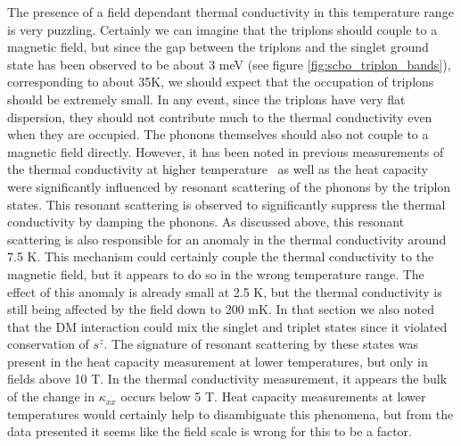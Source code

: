 \documentclass{thesis-umich}
\begin{document}
The presence of a field dependant thermal conductivity in this temperature range is very puzzling. Certainly we can imagine that the triplons should couple to a magnetic field, but since the gap between the triplons and the singlet ground state has been observed to be about 3 meV (see figure \ref{fig:scbo_triplon_bands}), corresponding to about 35K, we should expect that the occupation of triplons should be extremely small. In any event, since the triplons have very flat dispersion, they should not contribute much to the thermal conductivity even when they are occupied. The phonons themselves should also not couple to a magnetic field directly. However, it has been noted in previous measurements of the thermal conductivity at higher temperature~\cite{Hofmann2001} as well as the heat capacity~\cite{Jorge2005} were significantly influenced by resonant scattering of the phonons by the triplon states. This resonant scattering is observed to significantly suppress the thermal conductivity by damping the phonons. As discussed above, this resonant scattering is also responsible for an anomaly in the thermal conductivity around 7.5 K. This mechanism could certainly couple the thermal conductivity to the magnetic field, but it appears to do so in the wrong temperature range. The effect of this anomaly is already small at 2.5 K, but the thermal conductivity is still being affected by the field down to 200 mK. In that section we also noted that the DM interaction could mix the singlet and triplet states since it violated conservation of $s^z$. The signature of resonant scattering by these states was present in the heat capacity measurement at lower temperatures, but only in fields above 10 T. In the thermal conductivity measurement, it appears the bulk of the change in $\kappa_{xx}$ occurs below 5 T. Heat capacity measurements at lower temperatures would certainly help to disambiguate this phenomena, but from the data presented it seems like the field scale is wrong for this to be a factor.
\end{document}
